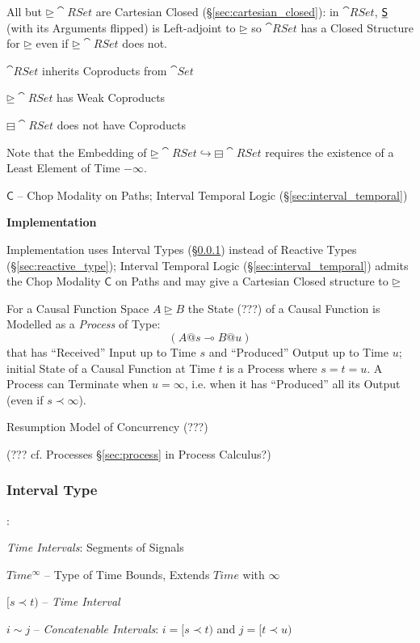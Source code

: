 All but $\unrhd\cat{RSet}$ are Cartesian Closed
(\S\ref{sec:cartesian_closed}): in $\cat{RSet}$, $\underline{\mathsf{S}}$
(with its Arguments flipped) is Left-adjoint to $\unrhd$ so
$\cat{RSet}$ has a Closed Structure for $\unrhd$ even if
$\unrhd\cat{RSet}$ does not.


$\cat{RSet}$ inherits Coproducts from $\cat{Set}$

$\unrhd\cat{RSet}$ has Weak Coproducts

$\boxminus\cat{RSet}$ does not have Coproducts

\fist Note that the Embedding of $\unrhd\cat{RSet} \hookrightarrow
\boxminus\cat{RSet}$ requires the existence of a Least Element of Time
$-\infty$.

$\mathsf{C}$ -- Chop Modality on Paths; Interval Temporal Logic
(\S\ref{sec:interval_temporal})


\asterism


\textbf{Implementation}

Implementation uses Interval Types (\S\ref{sec:interval_type}) instead
of Reactive Types (\S\ref{sec:reactive_type}); Interval Temporal Logic
(\S\ref{sec:interval_temporal}) admits the Chop Modality $\mathsf{C}$
on Paths and may give a Cartesian Closed structure to $\unrhd$

For a Causal Function Space $A \unrhd B$ the State (???) of a Causal
Function is Modelled as a \emph{Process} of Type:
\[
  (A @ s \multimap B @ u)
\]
that has ``Received'' Input up to Time $s$ and ``Produced'' Output up
to Time $u$; initial State of a Causal Function at Time $t$ is a
Process where $s = t = u$. A Process can Terminate when $u = \infty$,
i.e. when it has ``Produced'' all its Output (even if $s \prec
\infty$).

Resumption Model of Concurrency (???)

(??? cf. Processes \S\ref{sec:process} in Process Calculus?)



\subsubsection{Interval Type}\label{sec:interval_type}

\cite{jeffrey12}:

\emph{Time Intervals}: Segments of Signals

$Time^\infty$ -- Type of Time Bounds, Extends $Time$ with $\infty$

$[s \prec t)$ -- \emph{Time Interval}

$i \sim j$ -- \emph{Concatenable Intervals}: $i = [s \prec t)$ and $j
    = [t \prec u)$


